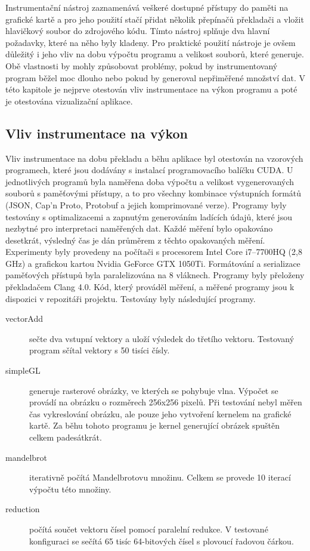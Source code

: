 Instrumentační nástroj zaznamenává veškeré dostupné přístupy do paměti na grafické kartě a pro jeho použití stačí přidat několik přepínačů překladači a vložit hlavičkový soubor do zdrojového kódu. Tímto nástroj splňuje dva hlavní požadavky, které na něho byly kladeny. Pro praktické použití nástroje je ovšem důležitý i jeho vliv na dobu výpočtu programu a velikost souborů, které generuje. Obě vlastnosti by mohly způsobovat problémy, pokud by instrumentovaný program běžel moc dlouho nebo pokud by generoval nepřiměřené množství dat. V této kapitole je nejprve otestován vliv instrumentace na výkon programu a poté je otestována vizualizační aplikace.

\subsection{Vliv instrumentace na výkon}
Vliv instrumentace na dobu překladu a běhu aplikace byl otestován na vzorových programech, které jsou dodávány s instalací programovacího balíčku CUDA. U jednotlivých programů byla naměřena doba výpočtu a velikost vygenerovaných souborů s paměťovými přístupy, a to pro všechny kombinace výstupních formátů (JSON, Cap'n Proto, Protobuf a jejich komprimované verze). Programy byly testovány s optimalizacemi a zapnutým generováním ladících údajů, které jsou nezbytné pro interpretaci naměřených dat. Každé měření bylo opakováno desetkrát, výsledný čas je dán průměrem z těchto opakovaných měření. Experimenty byly provedeny na počítači s procesorem Intel Core i7–7700HQ (2,8 GHz) a grafickou kartou Nvidia GeForce GTX 1050Ti. Formátování a serializace paměťových přístupů byla paralelizována na 8 vláknech. Programy byly přeloženy překladačem Clang 4.0. Kód, který prováděl měření, a měřené programy jsou k dispozici v repozitáři projektu. Testovány byly následující programy.
\begin{description}
	\item[vectorAdd] sečte dva vstupní vektory a uloží výsledek do třetího vektoru. Testovaný program sčítal vektory s 50 tisíci čísly.
	\item[simpleGL] generuje rasterové obrázky, ve kterých se pohybuje vlna. Výpočet se provádí na obrázku o rozměrech 256x256 pixelů. Při testování nebyl měřen čas vykreslování obrázku, ale pouze jeho vytvoření kernelem na grafické kartě. Za běhu tohoto programu je kernel generující obrázek spuštěn celkem padesátkrát.
	\item[mandelbrot] iterativně počítá Mandelbrotovu množinu. Celkem se provede 10 iterací výpočtu této množiny.
	\item[reduction] počítá součet vektoru čísel pomocí paralelní redukce. V testované konfiguraci se sečítá 65 tisíc 64-bitových čísel s plovoucí řadovou čárkou.
\end{description}


